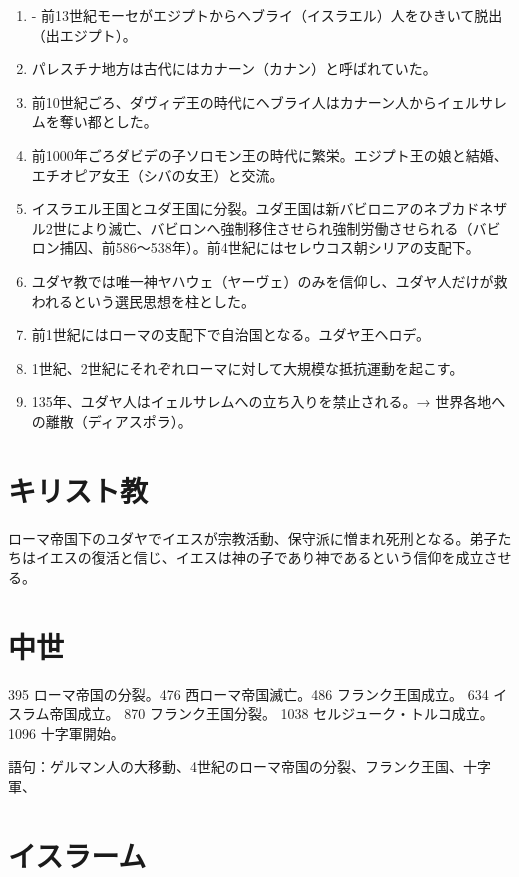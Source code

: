 \documentclass[twocolumn,autodetect-engine,dvipdfmx-if-dvi,ja=standard]{jsarticle} \usepackage{mystyle}
\begin{document}
\begin{enumerate}
\item - 前13世紀モーセがエジプトからヘブライ（イスラエル）人をひきいて脱出（出エジプト）。
\item パレスチナ地方は古代にはカナーン（カナン）と呼ばれていた。
\item 前10世紀ごろ、ダヴィデ王の時代にヘブライ人はカナーン人からイェルサレムを奪い都とした。
\item 前1000年ごろダビデの子ソロモン王の時代に繁栄。エジプト王の娘と結婚、エチオピア女王（シバの女王）と交流。
\item イスラエル王国とユダ王国に分裂。ユダ王国は新バビロニアのネブカドネザル2世により滅亡、バビロンへ強制移住させられ強制労働させられる（バビロン捕囚、前586〜538年）。前4世紀にはセレウコス朝シリアの支配下。
\item ユダヤ教では唯一神ヤハウェ（ヤーヴェ）のみを信仰し、ユダヤ人だけが救われるという選民思想を柱とした。
\item 前1世紀にはローマの支配下で自治国となる。ユダヤ王ヘロデ。
\item 1世紀、2世紀にそれぞれローマに対して大規模な抵抗運動を起こす。
\item 135年、ユダヤ人はイェルサレムへの立ち入りを禁止される。→ 世界各地への離散（ディアスポラ）。

\end{enumerate}
\section{キリスト教}

ローマ帝国下のユダヤでイエスが宗教活動、保守派に憎まれ死刑となる。弟子たちはイエスの復活と信じ、イエスは神の子であり神であるという信仰を成立させる。



\section{中世}

395 ローマ帝国の分裂。476 西ローマ帝国滅亡。486 フランク王国成立。
634 イスラム帝国成立。 870 フランク王国分裂。 1038 セルジューク・トルコ成立。1096 十字軍開始。


語句：ゲルマン人の大移動、4世紀のローマ帝国の分裂、フランク王国、十字軍、

\section{イスラーム}
\end{document}
